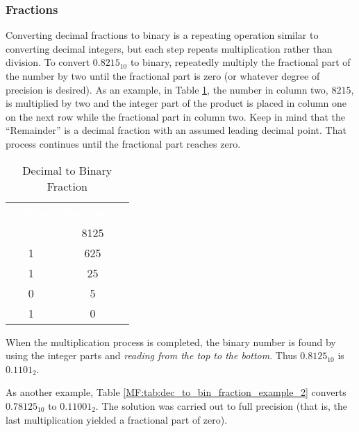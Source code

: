 \subsubsection{Fractions}
\label{MF:subsub:decimal_to_binary_fractions}
Converting decimal fractions to binary is a repeating operation similar to converting decimal integers, but each step repeats multiplication rather than division. To convert $ 0.8215_{10} $ to binary, repeatedly multiply the fractional part of the number by two until the fractional part is zero (or whatever degree of precision is desired). As an example, in Table \ref{MF:tab:dec_to_bin_fraction}, the number in column two, $ 8215 $, is multiplied by two and the integer part of the product is placed in column one on the next row while the fractional part in column two. Keep in mind that the ``Remainder'' is a decimal fraction with an assumed leading decimal point. That process continues until the fractional part reaches zero.

\begin{table}[H]
  \sffamily
  \newcommand{\head}[1]{\textcolor{white}{\textbf{#1}}}    
  \begin{center}
    \begin{tabular}{ c c } 
      \hline
      \rowcolor{black!75}
      \head{Integer} & \head{Remainder} \\
        & 8125 \\
      1 & 625 \\
      1 & 25 \\
      0 & 5 \\
      1 & 0 \\ \hline
    \end{tabular}
  \end{center}
  \caption{Decimal to Binary Fraction}
  \label{MF:tab:dec_to_bin_fraction}
\end{table}

When the multiplication process is completed, the binary number is found by using the integer parts and \emph{reading from the top to the bottom}. Thus $ 0.8125_{10} $ is $ 0.1101_2 $.

As another example, Table \ref{MF:tab:dec_to_bin_fraction_example_2} converts $ 0.78125_{10} $ to $ 0.11001_2 $. The solution was carried out to full precision (that is, the last multiplication yielded a fractional part of zero).

